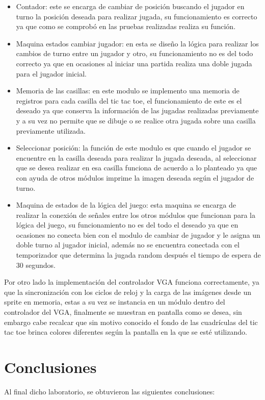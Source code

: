 \documentclass[journal,trans]{IEEEtran}
\begin{document}
	\begin{itemize}
		\item Contador: este se encarga de cambiar de posición buscando el jugador en turno la posición deseada para realizar jugada, su funcionamiento es correcto ya que como se comprobó en las pruebas realizadas realiza su función.
		\item Maquina estados cambiar jugador: en esta se diseño la lógica para realizar los cambios de turno entre un jugador y otro, su funcionamiento no es del todo correcto ya que en ocasiones al iniciar una partida realiza una doble jugada para el jugador inicial.
		\item Memoria de las casillas: en este modulo se implemento una memoria de registros para cada casilla del tic tac toe, el funcionamiento de este es el deseado ya que conserva la información de las jugadas realizadas previamente y a su vez no permite que se dibuje o se realice otra jugada sobre una casilla previamente utilizada.
		\item Seleccionar posición: la función de este modulo es que cuando el jugador se encuentre en la casilla deseada para realizar la jugada deseada, al seleccionar que se desea realizar en esa casilla funciona de acuerdo a lo planteado ya que con ayuda de otros módulos imprime la imagen deseada según el jugador de turno.
		\item Maquina de estados de la lógica del juego: esta maquina se encarga de realizar la conexión de señales entre los otros módulos que funcionan para la lógica del juego, su funcionamiento no es del todo el deseado ya que en ocasiones no conecta bien con el modulo de cambiar de jugador y le asigna un doble turno al jugador inicial, además no se encuentra conectada con el temporizador que determina la jugada random después el tiempo de espera de 30 segundos.
	\end{itemize}
	
	Por otro lado la implementación del controlador VGA funciona correctamente, ya que la sincronización con los ciclos de reloj y la carga de las imágenes desde un sprite en memoria, estas a su vez se instancia en un módulo dentro del controlador del VGA, finalmente se muestran en pantalla como se desea, sin embargo cabe recalcar que sin motivo conocido el fondo de las cuadrículas del tic tac toe brinca colores diferentes según la pantalla en la que se esté utilizando.
	
	\section{Conclusiones}
	Al final dicho laboratorio, se obtuvieron las siguientes conclusiones:
	
\end{document}
